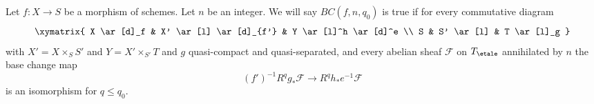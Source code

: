 \begin{remark}
\label{remark-base-change-holds}
Let $f : X \to S$ be a morphism of schemes. Let $n$ be an integer.
We will say $BC(f, n, q_0)$ is true if for every commutative diagram
$$
\xymatrix{
X \ar[d]_f & X' \ar[l] \ar[d]_{f'} & Y \ar[l]^h \ar[d]^e \\
S & S' \ar[l] & T \ar[l]_g
}
$$
with $X' = X \times_S S'$ and $Y = X' \times_{S'} T$ and
$g$ quasi-compact and quasi-separated, and every abelian sheaf
$\mathcal{F}$ on $T_\etale$ annihilated by $n$ the base change map
$$
(f')^{-1}R^qg_*\mathcal{F}
\longrightarrow
R^qh_*e^{-1}\mathcal{F}
$$
is an isomorphism for $q \leq q_0$.
\end{remark}
